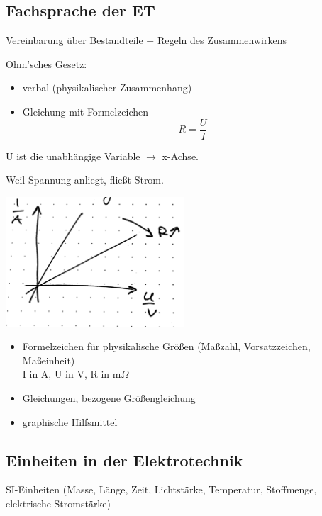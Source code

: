 \documentclass[10pt, a4paper]{article}
\newcommand{\ra}{$\rightarrow$ }
\begin{document}
\subsection{Fachsprache der ET}

Vereinbarung über Bestandteile + Regeln des Zusammenwirkens

 Ohm'sches Gesetz:

\begin{itemize}
	\item verbal (physikalischer Zusammenhang)
	\item Gleichung mit Formelzeichen\\
		$$R = \frac{U}{I}$$
\end{itemize}

U ist die unabhängige Variable \ra x-Achse.

\glqq Weil Spannung anliegt, fließt Strom.\grqq

\includegraphics[width=0.5\textwidth]{img/2}

\begin{itemize}
	\item Formelzeichen für physikalische Größen 
		(Maßzahl, Vorsatzzeichen, Maßeinheit)\\
		I in A, U in V, R in m$\Omega$
	\item Gleichungen, bezogene Größengleichung
	\item graphische Hilfsmittel
\end{itemize}

\subsection{Einheiten in der Elektrotechnik}

SI-Einheiten (Masse, Länge, Zeit, Lichtstärke, Temperatur, Stoffmenge, elektrische Stromstärke)
\end{document}
